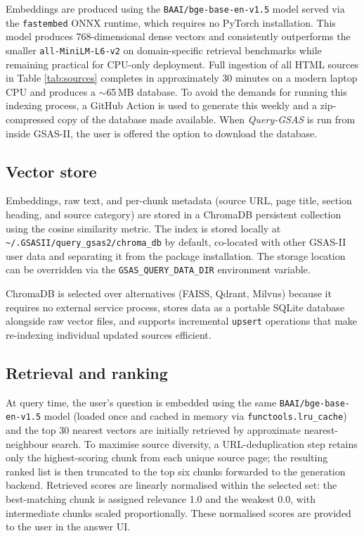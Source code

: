 Embeddings are produced using the \texttt{BAAI/bge-base-en-v1.5}
model \citep{bge2023embedding} served via the \texttt{fastembed} ONNX
runtime, which requires no PyTorch installation.
This model produces 768-dimensional dense vectors and consistently
outperforms the smaller \texttt{all-MiniLM-L6-v2}
\citep{wang2020minilm,reimers2019sbert} on domain-specific retrieval
benchmarks while remaining practical for CPU-only deployment.
Full ingestion of all HTML sources in Table \ref{tab:sources} completes in approximately
30 minutes on a modern laptop CPU and produces a $\sim$65\,MB database. To avoid the demands for running this indexing process, a GitHub Action is used to generate this weekly and a zip-compressed copy of the database made available. When \textit{Query-GSAS} is run from inside GSAS-II, the user is offered the option to download the database. 

\subsection{Vector store}

Embeddings, raw text, and per-chunk metadata (source URL, page title,
section heading, and source category) are stored in a ChromaDB
\citep{chromadb2023} persistent collection using the cosine similarity
metric.
The index is stored locally at \texttt{\textasciitilde/.GSASII/query\_gsas2/chroma\_db}
by default, co-located with other GSAS-II user data and separating it
from the package installation.
The storage location can be overridden via the
\texttt{GSAS\_QUERY\_DATA\_DIR} environment variable.

ChromaDB is selected over alternatives (FAISS, Qdrant, Milvus) because
it requires no external service process, stores data as a portable
SQLite database alongside raw vector files, and supports incremental
\texttt{upsert} operations that make re-indexing individual updated
sources efficient.

\subsection{Retrieval and ranking}
\label{sec:retrieval}

At query time, the user's question is embedded using the same
\texttt{BAAI/bge-base-en-v1.5} model (loaded once and cached in memory via
\texttt{functools.lru\_cache}) and the top 30 nearest vectors are
initially retrieved by approximate nearest-neighbour search.
To maximise source diversity, a URL-deduplication step retains only
the highest-scoring chunk from each unique source page; the resulting
ranked list is then truncated to the top six chunks forwarded to the
generation backend.
Retrieved scores are linearly normalised within the selected set:
the best-matching chunk is assigned relevance 1.0 and the weakest 0.0,
with intermediate chunks scaled proportionally.
These normalised scores are provided to the user in the answer UI.


